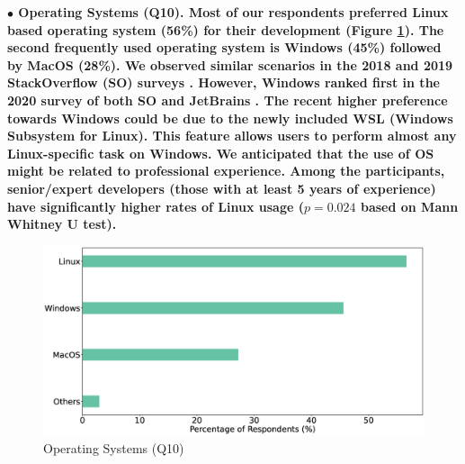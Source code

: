 \nd\bf{$\bullet$ Operating Systems (Q10).} Most of our
respondents preferred Linux based operating system (56\%) for their development (Figure \ref{fig:os}). The second frequently used
operating system is Windows (45\%) followed by MacOS (28\%). We
observed similar scenarios in the 2018 and 2019 StackOverflow (SO) surveys
\citep{StackoverflowSurvey2018,StackoverflowSurvey2019}. However, Windows ranked
first in the 2020 survey of both SO and JetBrains \citep{StackoverflowSurvey2020,
JetBrains2020}. The recent higher preference towards Windows could be due to the newly
included WSL (Windows Subsystem for Linux). This feature allows users to perform
almost any Linux-specific task on Windows. We anticipated that the use of OS
might be related to professional experience. Among the participants,
senior/expert developers (those with at least 5 years of experience) have significantly higher rates of Linux usage ($p=0.024$ based on Mann Whitney U test). 
\begin{figure}[h]
\centering
  \includegraphics[scale=0.17]{Figures/Respondents_os}
  \caption{Operating Systems (Q10)}
  \label{fig:os}
\end{figure}

